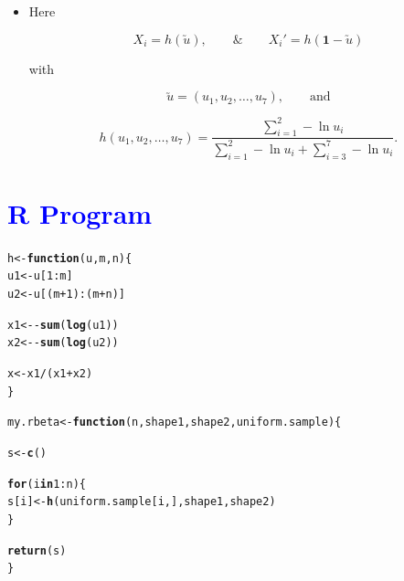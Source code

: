\documentclass[11pt, a4paper]{article}\usepackage[]{graphicx}\usepackage[]{xcolor}
\makeatletter
\newcommand{\hlnum}[1]{\textcolor[rgb]{0.686,0.059,0.569}{#1}}%
\newcommand{\hlopt}[1]{\textcolor[rgb]{0,0,0}{#1}}%
\newcommand{\hldef}[1]{\textcolor[rgb]{0.345,0.345,0.345}{#1}}%
\newcommand{\hlkwa}[1]{\textcolor[rgb]{0.161,0.373,0.58}{\textbf{#1}}}%
\newcommand{\hlkwb}[1]{\textcolor[rgb]{0.69,0.353,0.396}{#1}}%
\newcommand{\hlkwc}[1]{\textcolor[rgb]{0.333,0.667,0.333}{#1}}%
\newcommand{\hlkwd}[1]{\textcolor[rgb]{0.737,0.353,0.396}{\textbf{#1}}}%
\newenvironment{kframe}{%
 \def\at@end@of@kframe{}%
 \ifinner\ifhmode%
  \def\at@end@of@kframe{\end{minipage}}%
  \begin{minipage}{\columnwidth}%
 \fi\fi%
 \def\FrameCommand##1{\hskip\@totalleftmargin \hskip-\fboxsep
 \colorbox{shadecolor}{##1}\hskip-\fboxsep
     \hskip-\linewidth \hskip-\@totalleftmargin \hskip\columnwidth}%
 \MakeFramed {\advance\hsize-\width
   \@totalleftmargin\z@ \linewidth\hsize
   \@setminipage}}%
 {\par\unskip\endMakeFramed%
 \at@end@of@kframe}
\newenvironment{knitrout}{}{} %
\makeatother
\begin{document}
\begin{itemize}
\item Here

$$X_i = h(\utilde{u}), \qquad \& \qquad X_i' = h(\mathbf{1} - \utilde{u})$$

with

$$\utilde{u} = (u_1, u_2, \ldots, u_7), \qquad \text{and}$$

$$h(u_1, u_2, \ldots, u_7) = \dfrac{\sum \limits_{i = 1}^{2} - \ln u_i}{\sum \limits_{i = 1}^{2} - \ln u_i + \sum \limits_{i = 3}^{7} - \ln u_i}.$$

\end{itemize}

\section*{\faArrowAltCircleRight[regular] \textcolor{blue}{R Program}}






\begin{knitrout}
\color{fgcolor}\begin{kframe}
\begin{alltt}
\hldef{h} \hlkwb{<-} \hlkwa{function}\hldef{(}\hlkwc{u}\hldef{,} \hlkwc{m}\hldef{,} \hlkwc{n}\hldef{)\{}
  \hldef{u1} \hlkwb{<-} \hldef{u[}\hlnum{1}\hlopt{:}\hldef{m]}
  \hldef{u2} \hlkwb{<-} \hldef{u[(m} \hlopt{+} \hlnum{1}\hldef{)} \hlopt{:} \hldef{(m} \hlopt{+} \hldef{n)]}

  \hldef{x1} \hlkwb{<-} \hlopt{-}\hlkwd{sum}\hldef{(}\hlkwd{log}\hldef{(u1))}
  \hldef{x2} \hlkwb{<-} \hlopt{-}\hlkwd{sum}\hldef{(}\hlkwd{log}\hldef{(u2))}

  \hldef{x} \hlkwb{<-} \hldef{x1} \hlopt{/} \hldef{(x1} \hlopt{+} \hldef{x2)}
\hldef{\}}
\end{alltt}
\end{kframe}
\end{knitrout}

\begin{knitrout}
\color{fgcolor}\begin{kframe}
\begin{alltt}
\hldef{my.rbeta} \hlkwb{<-} \hlkwa{function}\hldef{(}\hlkwc{n}\hldef{,} \hlkwc{shape1}\hldef{,} \hlkwc{shape2}\hldef{,} \hlkwc{uniform.sample}\hldef{)\{}

  \hldef{s} \hlkwb{<-} \hlkwd{c}\hldef{()}

  \hlkwa{for} \hldef{(i} \hlkwa{in} \hlnum{1}\hlopt{:}\hldef{n) \{}
    \hldef{s[i]} \hlkwb{<-} \hlkwd{h}\hldef{(uniform.sample[i,], shape1, shape2)}
  \hldef{\}}

  \hlkwd{return}\hldef{(s)}
\hldef{\}}
\end{alltt}
\end{kframe}
\end{knitrout}
\end{document}
